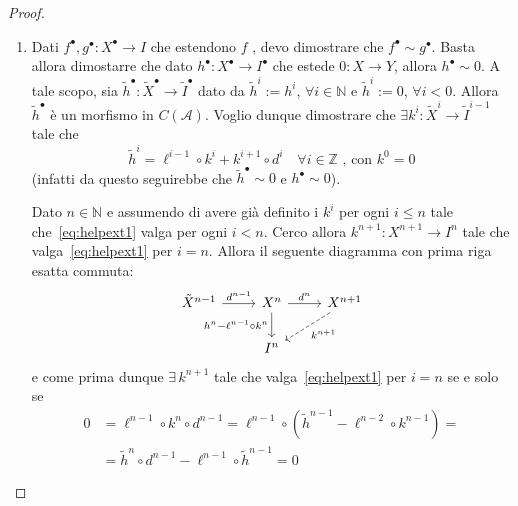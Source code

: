 \begin{proof}{}
\begin{enumerate}[label = \arabic*)]
    \item Dati \(f^\bullet, g^\bullet : X^\bullet \to I\) che estendono \(f\) ,
        devo dimostrare che \(f^\bullet \sim g^\bullet\). Basta allora
        dimostarre che dato \(h^\bullet : X^\bullet \to I^\bullet\) che estede
        \(0 : X \to Y\), allora \(h^\bullet \sim 0\).
        A tale scopo, sia \(\tilde{h}^\bullet : \tilde{X}^\bullet \to
        \tilde{I}^\bullet\) dato da \(\tilde{h}^{i} := h^{i}\), \(\forall i \in
        \mathbb{N}\) e \(\tilde{h}^{i} := 0\), \(\forall i < 0\). Allora
        \(\tilde{h}^\bullet\) è un morfismo in \(C{(\mathcal{A})}\). Voglio
        dunque dimostrare che \(\exists k^{i} : \tilde{X}^{i} \to
        \tilde{I}^{i-1}\) tale che 
        \begin{equation}\label{eq:helpext1}
          \tilde{h}^{i} = \ell^{i-1} \circ k^{i} + k^{i+1} \circ d^{i} \quad
          \forall i \in \mathbb{Z}\text{ , con \(k^{0} = 0\)}
        \end{equation}
        (infatti da questo seguirebbe che \(\tilde{h}^\bullet \sim 0 \) e
        \(h^\bullet \sim 0\)).

        Dato \(n \in \mathbb{N}\) e assumendo di avere già definito i \(k^{i}\)
        per ogni \(i \le n\) tale che~\eqref{eq:helpext1} valga per ogni \(i <
        n\). Cerco allora \(k^{n+1} : X^{n+1} \to I^{n}\) tale che
        valga~\eqref{eq:helpext1} per \(i = n\). Allora il seguente diagramma
        con prima riga esatta commuta:
    \[ \begin{tikzcd}
	\tilde{X}^{n-1} & {X}^{n} & {X}^{n+1} \\
	& I^{n}
	\arrow["{d^{n-1}}", from=1-1, to=1-2]
	\arrow["{d^{n}}", from=1-2, to=1-3]
	\arrow["{h^{n} - \ell^{n-1} \circ k^{n}}"', from=1-2, to=2-2]
	\arrow["{k^{n+1}}", dashed, from=1-3, to=2-2]
\end{tikzcd} \]
    e come prima dunque \(\exists \, k^{n+1}\) tale che
    valga~\eqref{eq:helpext1} per \(i = n\) se e solo se 
    \begin{align*}
        0 &= \ell^{n-1} \circ k^{n} \circ d^{n-1} = \ell^{n-1} \circ {\left(
        \tilde{h}^{n-1} - \ell^{n-2} \circ k^{n-1} \right)} = \\ &= \tilde{h}^{n} \circ
      d^{n-1} - \ell^{n-1} \circ \tilde{h}^{n-1} = 0
    \end{align*}
\end{enumerate}
\end{proof}


